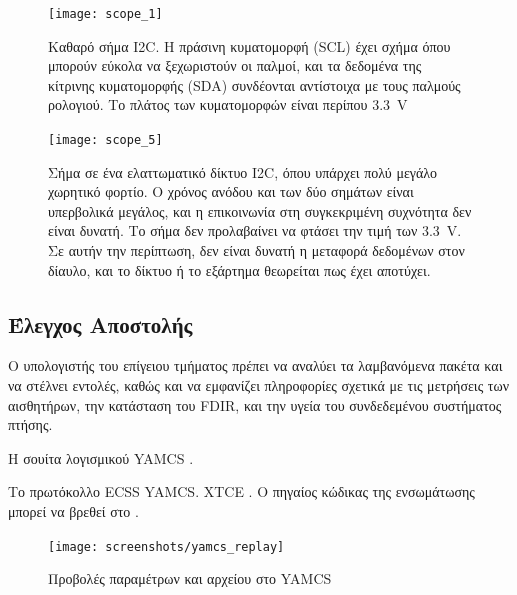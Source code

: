 \documentclass[a4paper,nobib]{tufte-book}
\begin{document}
\begin{figure}[h]
	\texttt{[image: scope\_1]}
	\caption[Καθαρό σήμα \acs{I2C}]{Καθαρό σήμα \acs{I2C}. Η πράσινη κυματομορφή (\acf{SCL}) έχει σχήμα όπου μπορούν εύκολα να ξεχωριστούν οι παλμοί, και τα δεδομένα της κίτρινης κυματομορφής (\acf{SDA}) συνδέονται αντίστοιχα με τους παλμούς ρολογιού. Το πλάτος των κυματομορφών είναι περίπου \SI{3.3}{\volt}}
	\label{subfig:i2c_clean}
\end{figure}

\begin{figure}[h]
	\texttt{[image: scope\_5]}
	\caption[Σήμα σε ένα ελαττωματικό δίκτυο \acs{I2C}]{Σήμα σε ένα ελαττωματικό δίκτυο \acs{I2C}, όπου υπάρχει πολύ μεγάλο χωρητικό φορτίο. Ο χρόνος ανόδου και των δύο σημάτων είναι υπερβολικά μεγάλος, και η επικοινωνία στη συγκεκριμένη συχνότητα δεν είναι δυνατή. Το σήμα δεν προλαβαίνει να φτάσει την τιμή των \SI{3.3}{\volt}. Σε αυτήν την περίπτωση, δεν είναι δυνατή η μεταφορά δεδομένων στον δίαυλο, και το δίκτυο ή το εξάρτημα θεωρείται πως έχει αποτύχει.}
	\label{subfig:i2c_dirty}
\end{figure}

\FloatBarrier

\subsection{Έλεγχος Αποστολής}

Ο υπολογιστής του επίγειου τμήματος πρέπει να αναλύει τα λαμβανόμενα πακέτα και να στέλνει εντολές, καθώς και να εμφανίζει πληροφορίες σχετικά με τις μετρήσεις των αισθητήρων, την κατάσταση του \ac{FDIR}, και την υγεία του συνδεδεμένου συστήματος πτήσης.

Η σουίτα λογισμικού \acs{YAMCS} \autocite{sela_yamcs_lightweight_2012} .

Το πρωτόκολλο \ac{ECSS} \autocite{ECSS-E-ST-70-41C}  \acs{YAMCS}.  \ac{XTCE} \autocite{simon_xtce_standard_2004}. Ο πηγαίος κώδικας της ενσωμάτωσης μπορεί να βρεθεί στο .

\begin{figure}[h]
	\texttt{[image: screenshots/yamcs\_replay]}
	\caption{Προβολές παραμέτρων και αρχείου στο \acs{YAMCS}}
\end{figure}
\end{document}
